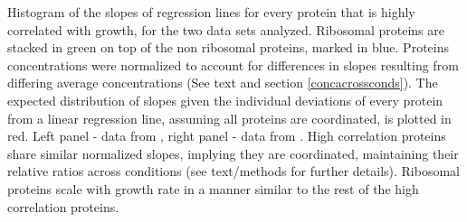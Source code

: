 \label{fig:globalfit}
    Histogram of the slopes of regression lines for every protein that is highly correlated with growth, for the two data sets analyzed.
    Ribosomal proteins are stacked in green on top of the non ribosomal proteins, marked in blue.
    Proteins concentrations were normalized to account for differences in slopes resulting from differing average concentrations (See text and section \ref{concacrossconds}).
    The expected distribution of slopes given the individual deviations of every protein from a linear regression line, assuming all proteins are coordinated, is plotted in red.
    Left panel - data from \cite{Heinemann2014}, right panel - data from \cite{Valgepea2013}.
    High correlation proteins share similar normalized slopes, implying they are coordinated, maintaining their relative ratios across conditions (see text/methods for further details).
    Ribosomal proteins scale with growth rate in a manner similar to the rest of the high correlation proteins.
